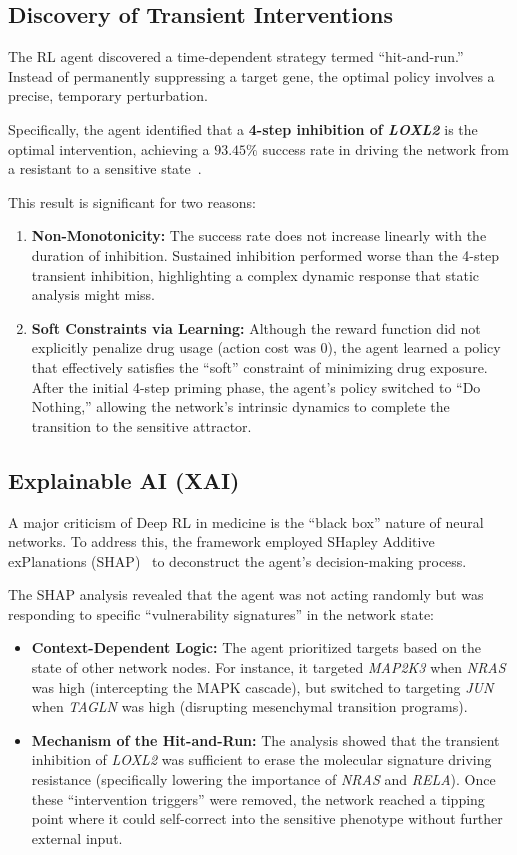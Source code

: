 \documentclass[12pt, a4paper]{report}
\begin{document}
	\subsection{Discovery of Transient Interventions}
	The RL agent discovered a time-dependent strategy termed ``hit-and-run.'' Instead of permanently suppressing a target gene, the optimal policy involves a precise, temporary perturbation.
	
	Specifically, the agent identified that a \textbf{4-step inhibition of \textit{LOXL2}} is the optimal intervention, achieving a $93.45\%$ success rate in driving the network from a resistant to a sensitive state~\cite{liu2025melanoma}. 
	
	This result is significant for two reasons:
	\begin{enumerate}
		\item \textbf{Non-Monotonicity:} The success rate does not increase linearly with the duration of inhibition. Sustained inhibition performed worse than the 4-step transient inhibition, highlighting a complex dynamic response that static analysis might miss.
		\item \textbf{Soft Constraints via Learning:} Although the reward function did not explicitly penalize drug usage (action cost was 0), the agent learned a policy that effectively satisfies the ``soft'' constraint of minimizing drug exposure. After the initial 4-step priming phase, the agent's policy switched to ``Do Nothing,'' allowing the network's intrinsic dynamics to complete the transition to the sensitive attractor.
	\end{enumerate}
	
	\subsection{Explainable AI (XAI)}
	A major criticism of Deep RL in medicine is the ``black box'' nature of neural networks. To address this, the framework employed SHapley Additive exPlanations (SHAP)~\cite{nohara2022explanation} to deconstruct the agent's decision-making process.
	
	The SHAP analysis revealed that the agent was not acting randomly but was responding to specific ``vulnerability signatures'' in the network state:
	\begin{itemize}
		\item \textbf{Context-Dependent Logic:} The agent prioritized targets based on the state of other network nodes. For instance, it targeted \textit{MAP2K3} when \textit{NRAS} was high (intercepting the MAPK cascade), but switched to targeting \textit{JUN} when \textit{TAGLN} was high (disrupting mesenchymal transition programs).
		\item \textbf{Mechanism of the Hit-and-Run:} The analysis showed that the transient inhibition of \textit{LOXL2} was sufficient to erase the molecular signature driving resistance (specifically lowering the importance of \textit{NRAS} and \textit{RELA}). Once these ``intervention triggers'' were removed, the network reached a tipping point where it could self-correct into the sensitive phenotype without further external input.
	\end{itemize}
	
\end{document}
